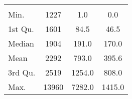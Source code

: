 \begin{tabular}{lS[table-format=5.1]S[table-format=5.1]S[table-format=5.1]}
&  &  &  \\
 Min.    & 1227 & 1.0 & 0.0 \\
 1st Qu. & 1601 & 84.5 & 46.5 \\
 Median  & 1904 & 191.0 & 170.0 \\
 Mean    & 2292 & 793.0 & 395.6 \\
 3rd Qu. & 2519 & 1254.0 & 808.0 \\
 Max.    & 13960 & 7282.0 & 1415.0 \\
\end{tabular}
